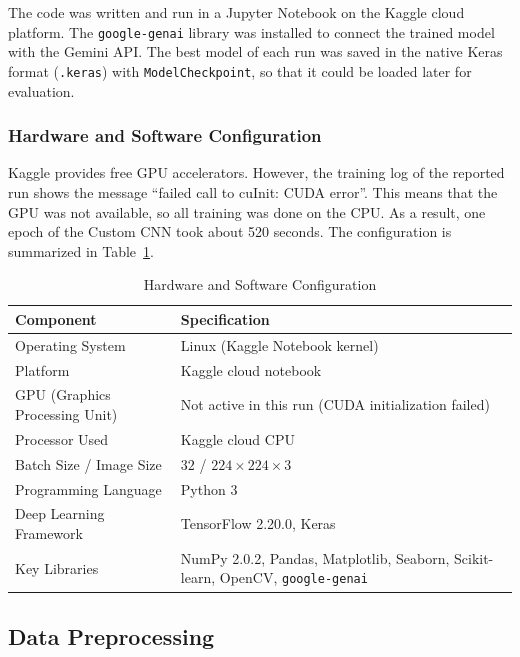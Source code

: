 The code was written and run in a Jupyter Notebook on the Kaggle cloud platform. The \texttt{google-genai} library was installed to connect the trained model with the Gemini API. The best model of each run was saved in the native Keras format (\texttt{.keras}) with \texttt{ModelCheckpoint}, so that it could be loaded later for evaluation.

\subsubsection{Hardware and Software Configuration}
Kaggle provides free GPU accelerators. However, the training log of the reported run shows the message ``failed call to cuInit: CUDA error''. This means that the GPU was not available, so all training was done on the CPU. As a result, one epoch of the Custom CNN took about 520 seconds. The configuration is summarized in Table~\ref{tab:hw_sw}.

\begin{table}[htbp]
\caption{Hardware and Software Configuration}
\label{tab:hw_sw}
\begin{center}
\begin{tabularx}{\textwidth}{| p{4.8cm} | X |}
\hline
\textbf{Component} & \textbf{Specification} \\
\hline
Operating System & Linux (Kaggle Notebook kernel) \\
\hline
Platform & Kaggle cloud notebook \\
\hline
GPU (Graphics Processing Unit) & Not active in this run (CUDA initialization failed) \\
\hline
Processor Used & Kaggle cloud CPU \\
\hline
Batch Size / Image Size & $32$ / $224 \times 224 \times 3$ \\
\hline
Programming Language & Python 3 \\
\hline
Deep Learning Framework & TensorFlow 2.20.0, Keras \cite{abadi2016tensorflow} \\
\hline
Key Libraries & NumPy 2.0.2, Pandas, Matplotlib, Seaborn, Scikit-learn, OpenCV, \texttt{google-genai} \\
\hline
\end{tabularx}
\end{center}
\end{table}

\subsection{Data Preprocessing}

